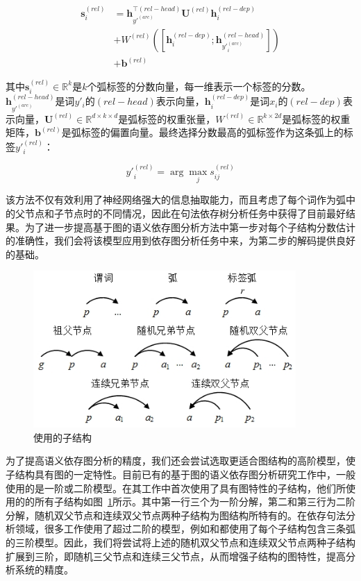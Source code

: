 \begin{equation}
\begin{split}
\mathbf{s}^{(rel)}_i & = \mathbf{h}_{y'^{(arc)}}^{\top(rel-head)}\mathbf{U}^{(rel)}\mathbf{h}^{(rel-dep)}_i \\
& + W^{(rel)}([\mathbf{h}^{(rel-dep)}_i; \mathbf{h}^{(rel-head)}_{y'^{(arc)}_i}]) \\
& + \mathbf{b}^{(rel)}
\end{split}
\end{equation}

其中$\mathbf{s}^{(rel)}_i \in \mathbb{R}^{k}$是$k$个弧标签的分数向量，每一维表示一个标签的分数。$\mathbf{h}_{y'^{(arc)}}^{(rel-head)}$是词$y'_i$的$(rel-head)$表示向量，$\mathbf{h}^{(rel-dep)}_i$是词$x_i$的$(rel-dep)$表示向量，$\mathbf{U}^{(rel)} \in \mathbb{R}^{d\times k \times d}$是弧标签的权重张量，$W^{(rel)} \in \mathbb{R}^{k \times 2d}$是弧标签的权重矩阵，$\mathbf{b}^{(rel)}$是弧标签的偏置向量。最终选择分数最高的弧标签作为这条弧上的标签$y'^{(rel)}_i$：

\begin{equation}
y'^{(rel)}_i = \arg \max_j s^{(rel)}_{ij}
\end{equation}

该方法不仅有效利用了神经网络强大的信息抽取能力，而且考虑了每个词作为弧中的父节点和子节点时的不同情况，因此在句法依存树分析任务中获得了目前最好结果。为了进一步提高基于图的语义依存图分析方法中第一步对每个子结构分数估计的准确性，我们会将该模型应用到依存图分析任务中来，为第二步的解码提供良好的基础。

\begin{figure}[hbtp]
	\centering
	\includegraphics[width=100mm]{picture/parts.jpg}
	\caption{使用的子结构}
	\label{fig:parts}
\end{figure}

为了提高语义依存图分析的精度，我们还会尝试选取更适合图结构的高阶模型，使子结构具有图的一定特性。目前已有的基于图的语义依存图分析研究工作中，一般使用的是一阶或二阶模型。在其工作中首次使用了具有图特性的子结构，他们所使用的的所有子结构如图~\ref{fig:parts}所示。其中第一行三个为一阶分解，第二和第三行为二阶分解，随机双父节点和连续双父节点两种子结构为图结构所特有的。在依存句法分析领域，很多工作使用了超过二阶的模型，例如和都使用了每个子结构包含三条弧的三阶模型。因此，我们将尝试将上述的随机双父节点和连续双父节点两种子结构扩展到三阶，即随机三父节点和连续三父节点，从而增强子结构的图特性，提高分析系统的精度。

